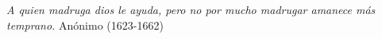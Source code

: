 \begin{flushright}

\textit{A quien madruga dios le ayuda,
\break
pero no por mucho madrugar amanece más temprano.}
\break
\break
Anónimo (1623-1662)
\break
\end{flushright}

